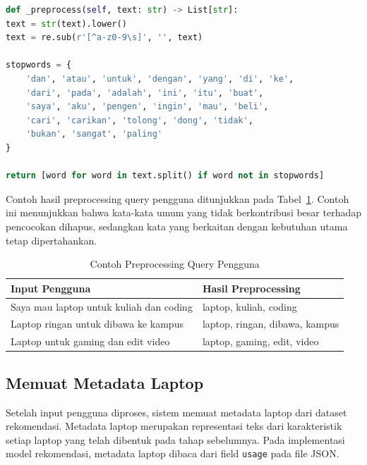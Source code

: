 \begin{lstlisting}[basicstyle=\linespread{0.8}\ttfamily\footnotesize, language=Python, breaklines=true, caption={Potongan Kode Preprocessing Teks pada Model Rekomendasi}, label=kode:preprocessing_teks_rekomendasi]
def _preprocess(self, text: str) -> List[str]:
text = str(text).lower()
text = re.sub(r'[^a-z0-9\s]', '', text)

stopwords = {
    'dan', 'atau', 'untuk', 'dengan', 'yang', 'di', 'ke',
    'dari', 'pada', 'adalah', 'ini', 'itu', 'buat',
    'saya', 'aku', 'pengen', 'ingin', 'mau', 'beli',
    'cari', 'carikan', 'tolong', 'dong', 'tidak',
    'bukan', 'sangat', 'paling'
}

return [word for word in text.split() if word not in stopwords]
\end{lstlisting}

Contoh hasil preprocessing query pengguna ditunjukkan pada Tabel~\ref{tab:contoh_preprocessing_query_bab3}. Contoh ini menunjukkan bahwa kata-kata umum yang tidak berkontribusi besar terhadap pencocokan dihapus, sedangkan kata yang berkaitan dengan kebutuhan utama tetap dipertahankan.

\begin{table}[htbp]
\centering
\caption{Contoh Preprocessing Query Pengguna}
\label{tab:contoh_preprocessing_query_bab3}
\begin{tabular}{|p{6cm}|p{6cm}|}
\hline
\textbf{Input Pengguna} & \textbf{Hasil Preprocessing} \\ \hline
Saya mau laptop untuk kuliah dan coding & laptop, kuliah, coding \\ \hline
Laptop ringan untuk dibawa ke kampus & laptop, ringan, dibawa, kampus \\ \hline
Laptop untuk gaming dan edit video & laptop, gaming, edit, video \\ \hline
\end{tabular}
\end{table}

\subsection{Memuat Metadata Laptop}
Setelah input pengguna diproses, sistem memuat metadata laptop dari dataset rekomendasi. Metadata laptop merupakan representasi teks dari karakteristik setiap laptop yang telah dibentuk pada tahap sebelumnya. Pada implementasi model rekomendasi, metadata laptop dibaca dari field \texttt{usage} pada file JSON.

